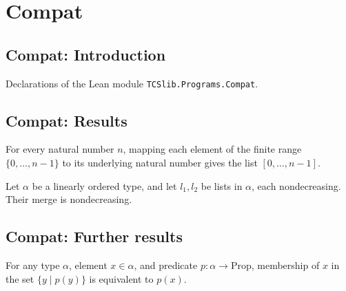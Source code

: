 \section{Compat}
\subsection*{Compat: Introduction}

Declarations of the Lean module \texttt{TCSlib.Programs.Compat}.

\subsection*{Compat: Results}

\begin{theorem}
\label{List.map_coe_finRange_eq_range}
\leanok
{}
For every natural number $n$, mapping each element of the finite range
$\{0,\ldots,n-1\}$ to its underlying natural number gives the list $[0,\ldots,n-1]$.
\end{theorem}

\begin{theorem}
\label{List.Pairwise.merge}
\leanok
{}
Let $\alpha$ be a linearly ordered type, and let $l_1,l_2$ be lists in $\alpha$, each
nondecreasing. Their merge is nondecreasing.
\end{theorem}

\subsection*{Compat: Further results}

\begin{theorem}
\label{Set.mem_ofPred_eq}
\leanok
{}
For any type $\alpha$, element $x\in\alpha$, and predicate $p:\alpha\to\mathrm{Prop}$,
membership of $x$ in the set $\{y\mid p(y)\}$ is equivalent to $p(x)$.
\end{theorem}
